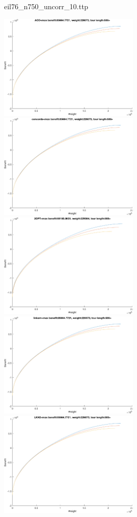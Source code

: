 \documentclass{article}
\begin{document}
\newpage
eil76\_n750\_uncorr\_10.ttp

\noindent
\includegraphics[width=0.5\textwidth]{eil76figs/eil76_n750_uncorr_10.ttp.aco.txt.atsf.eps}
\includegraphics[width=0.5\textwidth]{eil76figs/eil76_n750_uncorr_10.ttp.con.txt.atsf.eps}
\includegraphics[width=0.5\textwidth]{eil76figs/eil76_n750_uncorr_10.ttp.inv.txt.atsf.eps}
\includegraphics[width=0.5\textwidth]{eil76figs/eil76_n750_uncorr_10.ttp.lkh.txt.atsf.eps}
\includegraphics[width=0.5\textwidth]{eil76figs/eil76_n750_uncorr_10.ttp.lkh2.txt.atsf.eps}
\end{document}

